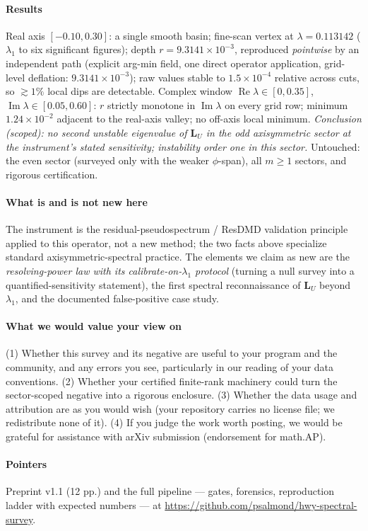 \documentclass[10pt]{article}
\newcommand{\LU}{\mathbf{L}_{U}}
\begin{document}
\paragraph{Results} Real axis $[-0.10, 0.30]$: a single smooth basin;
fine-scan vertex at $\lambda = 0.113142$ ($\lambda_1$ to six
significant figures); depth $r = 9.3141\times 10^{-3}$, reproduced
\emph{pointwise} by an independent path (explicit arg-min field, one
direct operator application, grid-level deflation: $9.3141\times
10^{-3}$); raw values stable to $1.5\times 10^{-4}$ relative across
cuts, so $\gtrsim 1\%$ local dips are detectable. Complex window
$\operatorname{Re}\lambda \in [0,0.35]$, $\operatorname{Im}\lambda \in
[0.05,0.60]$: $r$ strictly monotone in $\operatorname{Im}\lambda$ on
every grid row; minimum $1.24\times 10^{-2}$ adjacent to the real-axis
valley; no off-axis local minimum. \emph{Conclusion (scoped): no
second unstable eigenvalue of $\LU$ in the odd axisymmetric sector at
the instrument's stated sensitivity; instability order one in this
sector.} Untouched: the even sector (surveyed only with the weaker
$\phi$-span), all $m \ge 1$ sectors, and rigorous certification.

\paragraph{What is and is not new here} The instrument is the residual-pseudospectrum / ResDMD validation principle applied to this operator, not a new method; the two facts above specialize standard axisymmetric-spectral practice. The elements we claim as new are the \emph{resolving-power law with its calibrate-on-$\lambda_1$ protocol} (turning a null survey into a quantified-sensitivity statement), the first spectral reconnaissance of $\LU$ beyond $\lambda_1$, and the documented false-positive case study.

\paragraph{What we would value your view on} (1) Whether this survey
and its negative are useful to your program and the community, and any
errors you see, particularly in our reading of your data conventions.
(2) Whether your certified finite-rank machinery could turn the
sector-scoped negative into a rigorous enclosure. (3) Whether the data
usage and attribution are as you would wish (your repository carries no
license file; we redistribute none of it). (4) If you judge the work
worth posting, we would be grateful for assistance with arXiv
submission (endorsement for math.AP).

\paragraph{Pointers} Preprint v1.1 (12 pp.) and the full pipeline
--- gates, forensics, reproduction ladder with expected numbers ---
at \url{https://github.com/psalmond/hwy-spectral-survey}.
\end{document}

